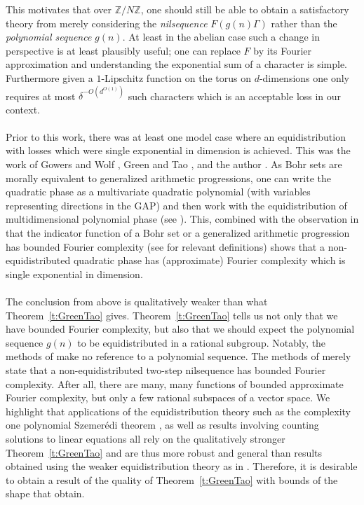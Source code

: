 \documentclass[11pt, a4paper]{amsart}
\theoremstyle{plain}
\theoremstyle{plain}
\theoremstyle{definition}
\theoremstyle{remark}
\numberwithin{equation}{section}
\numberwithin{lemma}{section}
\numberwithin{proposition}{section}
\numberwithin{corollary}{section}
\numberwithin{definition}{section}
\numberwithin{claim}{section}
\begin{document}
This motivates that over $\mathbb{Z}/N\mathbb{Z}$, one should still be able to obtain a satisfactory theory from merely considering the \emph{nilsequence} $F(g(n)\Gamma)$ rather than the \emph{polynomial sequence} $g(n)$. At least in the abelian case such a change in perspective is at least plausibly useful; one can replace $F$ by its Fourier approximation and understanding the exponential sum of a character is simple. Furthermore given a $1$-Lipschitz function on the torus on $d$-dimensions one only requires at most $\delta^{-O(d^{O(1)})}$ such characters which is an acceptable loss in our context. \\\\
Prior to this work, there was at least one model case where an equidistribution with losses which were single exponential in dimension is achieved. This was the work of Gowers and Wolf \cite{GW11}, Green and Tao \cite{GT17}, and the author \cite{Len22b}. As Bohr sets are morally equivalent to generalized arithmetic progressions, one can write the quadratic phase as a multivariate quadratic polynomial (with variables representing directions in the GAP) and then work with the equidistribution of multidimensional polynomial phase (see \cite{TaoBlog1}). This, combined with the observation in that the indicator function of a Bohr set or a generalized arithmetic progression has bounded Fourier complexity (see \cite[Section 3]{Len22b} for relevant definitions) shows that a non-equidistributed quadratic phase has (approximate) Fourier complexity which is single exponential in dimension. \\\\
The conclusion from above is qualitatively weaker than what Theorem~\ref{t:GreenTao} gives. Theorem~\ref{t:GreenTao} tells us not only that we have bounded Fourier complexity, but also that we should expect the polynomial sequence $g(n)$ to be equidistributed in a rational subgroup. Notably, the methods of \cite{GW11, GT17, Len22b} make no reference to a polynomial sequence. The methods of \cite{GW11, GT17, Len22b} merely state that a non-equidistributed two-step nilsequence has bounded Fourier complexity. After all, there are many, many functions of bounded approximate Fourier complexity, but only a few rational subspaces of a vector space. We highlight that applications of the equidistribution theory such as the complexity one polynomial Szemer\'edi theorem \cite{Len22, PSS23}, as well as results involving counting solutions to linear equations \cite{Alt22, Alt22b, CS14, GT10b, Kuc21, Kuc23} all rely on the qualitatively stronger Theorem~\ref{t:GreenTao} and are thus more robust and general than results obtained using the weaker equidistribution theory as in \cite{GW11, GT17, Len22b}. Therefore, it is desirable to obtain a result of the quality of Theorem~\ref{t:GreenTao} with bounds of the shape that \cite{GW11, GT17, Len22b} obtain.
\end{document}
